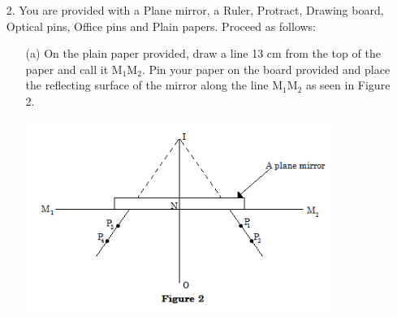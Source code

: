 \begin{enumerate}
\item[2.] You are provided with a Plane mirror, a Ruler, Protract, Drawing board, Optical pins, Office pins and Plain papers. Proceed as follows:
\begin{enumerate}
\item[(a)] On the plain paper provided, draw a line 13 cm from the top of the paper and call it M$_1$M$_2$. Pin your paper on the board provided and place the reflecting surface of the mirror along the line M$_1$M$_2$ as seen in Figure 2.

\begin{center}
\includegraphics[width=10cm]{./img/2013-2-alt.png}
\end{center}


\end{enumerate}
\end{enumerate}
